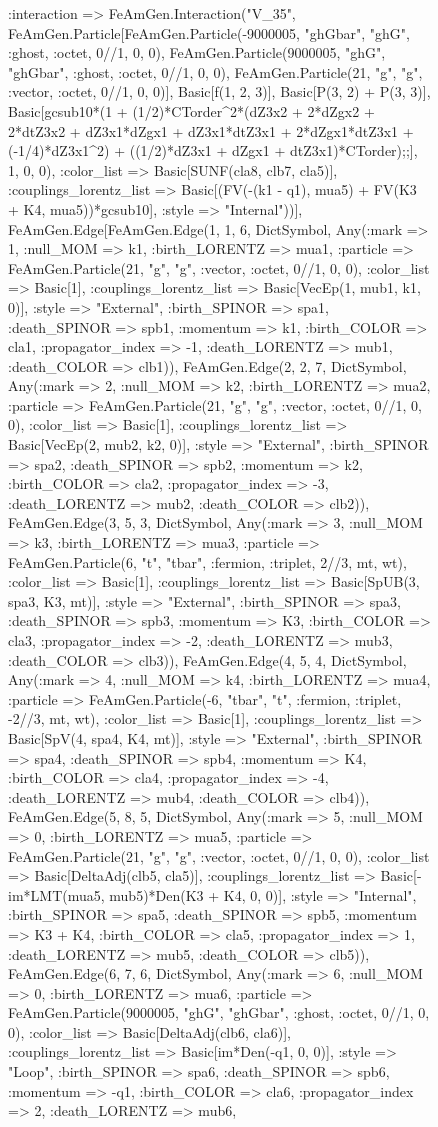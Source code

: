 \documentclass{revtex4}
\begin{document}
\begin{figure}[!htb]
\begin{center}
{:interaction => FeAmGen.Interaction("V_35", FeAmGen.Particle[FeAmGen.Particle(-9000005, "ghGbar", "ghG", :ghost, :octet, 0//1, 0, 0), FeAmGen.Particle(9000005, "ghG", "ghGbar", :ghost, :octet, 0//1, 0, 0), FeAmGen.Particle(21, "g", "g", :vector, :octet, 0//1, 0, 0)], Basic[f(1, 2, 3)], Basic[P(3, 2) + P(3, 3)], Basic[gcsub10*(1 + (1/2)*CTorder^2*(dZ3x2 + 2*dZgx2 + 2*dtZ3x2 + dZ3x1*dZgx1 + dZ3x1*dtZ3x1 + 2*dZgx1*dtZ3x1 + (-1/4)*dZ3x1^2) + ((1/2)*dZ3x1 + dZgx1 + dtZ3x1)*CTorder);;], 1, 0, 0), :color_list => Basic[SUNF(cla8, clb7, cla5)], :couplings_lorentz_list => Basic[(FV(-(k1 - q1), mua5) + FV(K3 + K4, mua5))*gcsub10], :style => "Internal"))], FeAmGen.Edge[FeAmGen.Edge(1, 1, 6, Dict{Symbol, Any}(:mark => 1, :null_MOM => k1, :birth_LORENTZ => mua1, :particle => FeAmGen.Particle(21, "g", "g", :vector, :octet, 0//1, 0, 0), :color_list => Basic[1], :couplings_lorentz_list => Basic[VecEp(1, mub1, k1, 0)], :style => "External", :birth_SPINOR => spa1, :death_SPINOR => spb1, :momentum => k1, :birth_COLOR => cla1, :propagator_index => -1, :death_LORENTZ => mub1, :death_COLOR => clb1)), FeAmGen.Edge(2, 2, 7, Dict{Symbol, Any}(:mark => 2, :null_MOM => k2, :birth_LORENTZ => mua2, :particle => FeAmGen.Particle(21, "g", "g", :vector, :octet, 0//1, 0, 0), :color_list => Basic[1], :couplings_lorentz_list => Basic[VecEp(2, mub2, k2, 0)], :style => "External", :birth_SPINOR => spa2, :death_SPINOR => spb2, :momentum => k2, :birth_COLOR => cla2, :propagator_index => -3, :death_LORENTZ => mub2, :death_COLOR => clb2)), FeAmGen.Edge(3, 5, 3, Dict{Symbol, Any}(:mark => 3, :null_MOM => k3, :birth_LORENTZ => mua3, :particle => FeAmGen.Particle(6, "t", "tbar", :fermion, :triplet, 2//3, mt, wt), :color_list => Basic[1], :couplings_lorentz_list => Basic[SpUB(3, spa3, K3, mt)], :style => "External", :birth_SPINOR => spa3, :death_SPINOR => spb3, :momentum => K3, :birth_COLOR => cla3, :propagator_index => -2, :death_LORENTZ => mub3, :death_COLOR => clb3)), FeAmGen.Edge(4, 5, 4, Dict{Symbol, Any}(:mark => 4, :null_MOM => k4, :birth_LORENTZ => mua4, :particle => FeAmGen.Particle(-6, "tbar", "t", :fermion, :triplet, -2//3, mt, wt), :color_list => Basic[1], :couplings_lorentz_list => Basic[SpV(4, spa4, K4, mt)], :style => "External", :birth_SPINOR => spa4, :death_SPINOR => spb4, :momentum => K4, :birth_COLOR => cla4, :propagator_index => -4, :death_LORENTZ => mub4, :death_COLOR => clb4)), FeAmGen.Edge(5, 8, 5, Dict{Symbol, Any}(:mark => 5, :null_MOM => 0, :birth_LORENTZ => mua5, :particle => FeAmGen.Particle(21, "g", "g", :vector, :octet, 0//1, 0, 0), :color_list => Basic[DeltaAdj(clb5, cla5)], :couplings_lorentz_list => Basic[-im*LMT(mua5, mub5)*Den(K3 + K4, 0, 0)], :style => "Internal", :birth_SPINOR => spa5, :death_SPINOR => spb5, :momentum => K3 + K4, :birth_COLOR => cla5, :propagator_index => 1, :death_LORENTZ => mub5, :death_COLOR => clb5)), FeAmGen.Edge(6, 7, 6, Dict{Symbol, Any}(:mark => 6, :null_MOM => 0, :birth_LORENTZ => mua6, :particle => FeAmGen.Particle(9000005, "ghG", "ghGbar", :ghost, :octet, 0//1, 0, 0), :color_list => Basic[DeltaAdj(clb6, cla6)], :couplings_lorentz_list => Basic[im*Den(-q1, 0, 0)], :style => "Loop", :birth_SPINOR => spa6, :death_SPINOR => spb6, :momentum => -q1, :birth_COLOR => cla6, :propagator_index => 2, :death_LORENTZ => mub6, }
\end{center}
\end{figure}
\end{document}
